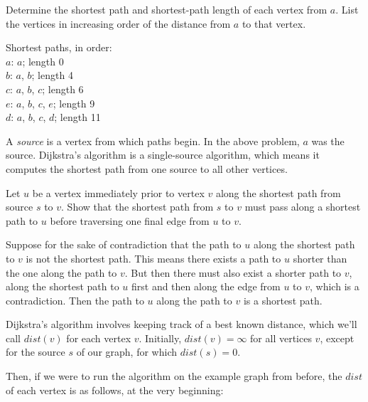 \documentclass[11pt]{article}
\begin{document}
\begin{problem} %
\label{example-computation}
Determine the shortest path and shortest-path length of each vertex from $a$. List the vertices in increasing order of the distance
from $a$ to that vertex.
\end{problem}

\begin{solution}
Shortest paths, in order: \\
$a$: $a$; length 0 \\
$b$: $a$, $b$; length 4 \\
$c$: $a$, $b$, $c$; length 6 \\
$e$: $a$, $b$, $c$, $e$; length 9 \\
$d$: $a$, $b$, $c$, $d$; length 11
\end{solution}

\begin{definition}
\label{def:source}
A \textit{source} is a vertex from which paths begin. In the above problem, $a$ was the source. Dijkstra's algorithm
is a single-source algorithm, which means it computes the shortest path from one source to all other vertices.
\end{definition}

\begin{problem} %
Let $u$ be a vertex immediately prior to vertex $v$ along the shortest path from source $s$ to $v$. Show that the shortest path from $s$ to $v$ must
pass along a shortest path to $u$ before traversing one final edge from $u$ to $v$.
\end{problem}

\begin{solution}
Suppose for the sake of contradiction that the path to $u$ along the shortest path to $v$ is not the shortest path. This means
there exists a path to $u$ shorter than the one along the path to $v$. But then there must also exist a shorter path to $v$, along
the shortest path to $u$ first and then along the edge from $u$ to $v$, which is a contradiction. Then the path to $u$ along the path to $v$
is a shortest path.
\end{solution}

Dijkstra's algorithm involves keeping track of a best known distance, which we'll call $dist(v)$ for each vertex $v$. Initially, $dist(v) = \infty$ for
all vertices $v$, except for the source $s$ of our graph, for which $dist(s) = 0$.

Then, if we were to run the algorithm on the example graph from before, the $dist$ of each vertex is as follows, at the very beginning:
\end{document}
